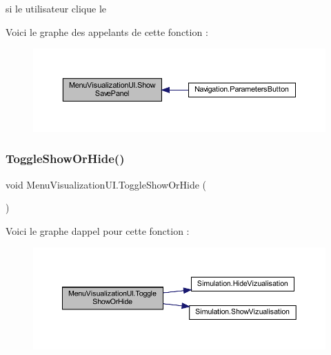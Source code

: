 si le utilisateur clique le 

Voici le graphe des appelants de cette fonction \+:
\nopagebreak
\begin{figure}[H]
\begin{center}
\leavevmode
\includegraphics[width=350pt]{class_menu_visualization_u_i_aabfef8a72ef59e04916f6d95a1274431_icgraph}
\end{center}
\end{figure}
\mbox{\label{class_menu_visualization_u_i_acc1ed888dd19359811e473ffbd2fa86a}} 
\subsubsection{\texorpdfstring{Toggle\+Show\+Or\+Hide()}{ToggleShowOrHide()}}
{\footnotesize\ttfamily void Menu\+Visualization\+U\+I.\+Toggle\+Show\+Or\+Hide (\begin{DoxyParamCaption}{ }\end{DoxyParamCaption})\hspace{0.3cm}{\ttfamily [inline]}}

Voici le graphe d\textquotesingle{}appel pour cette fonction \+:
\nopagebreak
\begin{figure}[H]
\begin{center}
\leavevmode
\includegraphics[width=350pt]{class_menu_visualization_u_i_acc1ed888dd19359811e473ffbd2fa86a_cgraph}
\end{center}
\end{figure}


